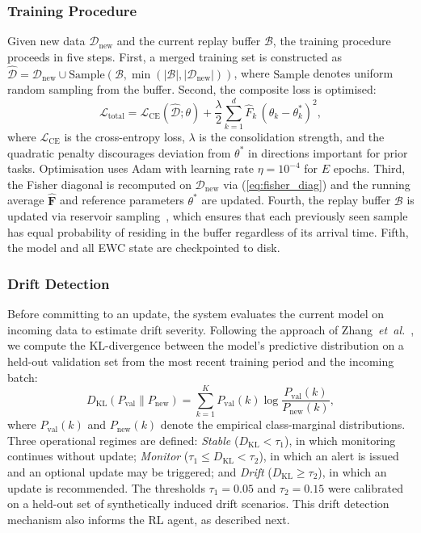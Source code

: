 \documentclass[journal]{IEEEtran}
\theoremstyle{definition}
\theoremstyle{remark}
\newcommand{\FIM}{\mathbf{F}}
\newcommand{\loss}{\mathcal{L}}
\begin{document}
\subsubsection{Training Procedure}
Given new data $\mathcal{D}_{\mathrm{new}}$ and the current replay buffer $\mathcal{B}$, the training procedure proceeds in five steps. First, a merged training set is constructed as $\hat{\mathcal{D}} = \mathcal{D}_{\mathrm{new}} \cup \mathrm{Sample}(\mathcal{B}, \min(|\mathcal{B}|, |\mathcal{D}_{\mathrm{new}}|))$, where $\mathrm{Sample}$ denotes uniform random sampling from the buffer. Second, the composite loss is optimised:
\begin{equation}
\label{eq:ewc_loss}
\loss_{\mathrm{total}} = \loss_{\mathrm{CE}}(\hat{\mathcal{D}};\theta) + \frac{\lambda}{2}\sum_{k=1}^{d} \hat{F}_k\,(\theta_k - \theta_k^*)^2,
\end{equation}
where $\loss_{\mathrm{CE}}$ is the cross-entropy loss, $\lambda$ is the consolidation strength, and the quadratic penalty discourages deviation from $\theta^*$ in directions important for prior tasks. Optimisation uses Adam with learning rate $\eta = 10^{-4}$ for $E$ epochs. Third, the Fisher diagonal is recomputed on $\mathcal{D}_{\mathrm{new}}$ via (\ref{eq:fisher_diag}) and the running average $\hat{\FIM}$ and reference parameters $\theta^*$ are updated. Fourth, the replay buffer $\mathcal{B}$ is updated via reservoir sampling~\cite{vitter1985reservoir}, which ensures that each previously seen sample has equal probability of residing in the buffer regardless of its arrival time. Fifth, the model and all EWC state are checkpointed to disk.

\subsubsection{Drift Detection}
\label{subsubsec:drift}
Before committing to an update, the system evaluates the current model on incoming data to estimate drift severity. Following the approach of Zhang~\textit{et~al.}~\cite{zhang2025ssf}, we compute the KL-divergence between the model's predictive distribution on a held-out validation set from the most recent training period and the incoming batch:
\begin{equation}
\label{eq:drift}
D_{\mathrm{KL}}(P_{\mathrm{val}} \| P_{\mathrm{new}}) = \sum_{k=1}^{K} P_{\mathrm{val}}(k)\log\frac{P_{\mathrm{val}}(k)}{P_{\mathrm{new}}(k)},
\end{equation}
where $P_{\mathrm{val}}(k)$ and $P_{\mathrm{new}}(k)$ denote the empirical class-marginal distributions. Three operational regimes are defined: \textit{Stable} ($D_{\mathrm{KL}} < \tau_1$), in which monitoring continues without update; \textit{Monitor} ($\tau_1 \leq D_{\mathrm{KL}} < \tau_2$), in which an alert is issued and an optional update may be triggered; and \textit{Drift} ($D_{\mathrm{KL}} \geq \tau_2$), in which an update is recommended. The thresholds $\tau_1 = 0.05$ and $\tau_2 = 0.15$ were calibrated on a held-out set of synthetically induced drift scenarios. This drift detection mechanism also informs the RL agent, as described next.
\end{document}

